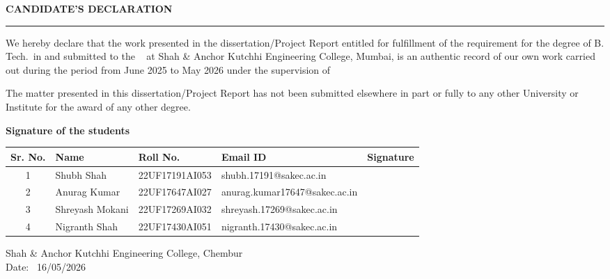 \thispagestyle{empty}

\begin{center}
{\Large {\bf \uppercase{Candidate's Declaration}}}
\end{center}

\vspace{\baselineskip}
\hrule
\vspace{2\baselineskip}

We hereby declare that the work presented in the dissertation/Project Report entitled {{\mytitle}} for fulfillment of the requirement for the degree of B. Tech.\ in \branch and submitted to the \mydep~ at Shah \& Anchor Kutchhi Engineering College, Mumbai, is an authentic record of our own work carried out during the period from June 2025 to May 2026 under the supervision of {\mysupervisor} \par
\vspace{2\baselineskip}
The matter presented in this dissertation/Project Report has not been submitted elsewhere in part or fully to any other University or Institute for the award of any other degree.


\bigskip


\bigskip


\bigskip

{\textbf{Signature of the students \ \ \ \ \ \ }}

  \begin{table}[htbp]
\centering
\begin{tabular}{|c|l|l|l|l|}
\hline
\textbf{Sr. No.} & \textbf{Name} & \textbf{Roll No.} & \textbf{Email ID}  & Signature\\ \hline
1 & Shubh Shah& 22UF17191AI053& shubh.17191@sakec.ac.in&\\ \hline
2 & Anurag Kumar& 22UF17647AI027& anurag.kumar17647@sakec.ac.in&\\ \hline
3 & Shreyash Mokani& 22UF17269AI032& shreyash.17269@sakec.ac.in&\\ \hline
4 & Nigranth Shah& 22UF17430AI051& nigranth.17430@sakec.ac.in&\\ \hline
\end{tabular}
\end{table}

\noindent
Shah \& Anchor Kutchhi Engineering College, Chembur \\
Date: \ 16/05/2026